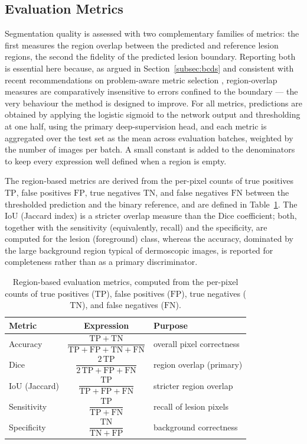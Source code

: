 \subsection{Evaluation Metrics}
\label{subsec:metrics}

Segmentation quality is assessed with two complementary families of metrics: the first measures the region overlap between the predicted and reference lesion regions, the second the fidelity of the predicted lesion boundary. Reporting both is essential here because, as argued in Section~\ref{subsec:bcds} and consistent with recent recommendations on problem-aware metric selection \cite{ref30}, region-overlap measures are comparatively insensitive to errors confined to the boundary --- the very behaviour the method is designed to improve. For all metrics, predictions are obtained by applying the logistic sigmoid to the network output and thresholding at one half, using the primary deep-supervision head, and each metric is aggregated over the test set as the mean across evaluation batches, weighted by the number of images per batch. A small constant is added to the denominators to keep every expression well defined when a region is empty.

The region-based metrics are derived from the per-pixel counts of true positives $\mathrm{TP}$, false positives $\mathrm{FP}$, true negatives $\mathrm{TN}$, and false negatives $\mathrm{FN}$ between the thresholded prediction and the binary reference, and are defined in Table~\ref{tab:metrics}. The IoU (Jaccard index) is a stricter overlap measure than the Dice coefficient; both, together with the sensitivity (equivalently, recall) and the specificity, are computed for the lesion (foreground) class, whereas the accuracy, dominated by the large background region typical of dermoscopic images, is reported for completeness rather than as a primary discriminator.

\begin{table}[!t]
\centering
\renewcommand{\arraystretch}{1.35}
\caption{Region-based evaluation metrics, computed from the per-pixel counts of
true positives ($\mathrm{TP}$), false positives ($\mathrm{FP}$), true negatives
($\mathrm{TN}$), and false negatives ($\mathrm{FN}$).}
\label{tab:metrics}
\setlength{\tabcolsep}{5pt}
\footnotesize
\begin{tabular}{@{}lcl@{}}
\toprule
Metric & Expression & Purpose \\
\midrule
Accuracy & $\dfrac{\mathrm{TP}+\mathrm{TN}}{\mathrm{TP}+\mathrm{FP}+\mathrm{TN}+\mathrm{FN}}$ & overall pixel correctness \\
Dice & $\dfrac{2\,\mathrm{TP}}{2\,\mathrm{TP}+\mathrm{FP}+\mathrm{FN}}$ & region overlap (primary) \\
IoU (Jaccard) & $\dfrac{\mathrm{TP}}{\mathrm{TP}+\mathrm{FP}+\mathrm{FN}}$ & stricter region overlap \\
Sensitivity & $\dfrac{\mathrm{TP}}{\mathrm{TP}+\mathrm{FN}}$ & recall of lesion pixels \\
Specificity & $\dfrac{\mathrm{TN}}{\mathrm{TN}+\mathrm{FP}}$ & background correctness \\
\bottomrule
\end{tabular}
\end{table}

